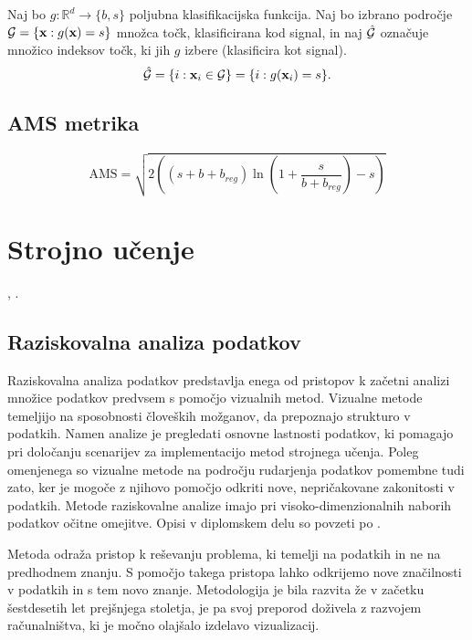 \documentclass[11pt,a4paper,openany]{book}
\begin{document}
Naj bo $g : \mathbb{R}^d \rightarrow \{b, s\}$ poljubna klasifikacijska funkcija. Naj bo izbrano področje ${\cal G} = \{\textbf{x} : g(\textbf{x}) = s\}$ množca točk, klasificirana kod signal, in naj $\hat{\cal G}$ označuje množico indeksov točk, ki jih $g$ izbere (klasificira kot signal).
\begin{equation*}
\hat{\cal G} = \{ i : \textbf{x}_i \in {\cal G}\} = \{ i : g(\textbf{x}_i) = s \}.
\end{equation*}


\section{AMS metrika}
\label{sc:ams}
\begin{equation}
\text{AMS} = \sqrt{2 \left( ( s + b + b_{reg} ) \ln \left( 1 +  \frac{s}{b + b_{reg}} \right) - s \right) }
\label{en:ams}
\end{equation}

\chapter{Strojno učenje}

\cite{Mitchell1997}, \cite{Witten2005}.

\section{Raziskovalna analiza podatkov}
Raziskovalna analiza podatkov predstavlja enega od pristopov k začetni analizi množice podatkov predvsem s pomočjo vizualnih metod. Vizualne metode temeljijo na sposobnosti človeških možganov, da prepoznajo strukturo v podatkih. Namen analize je pregledati osnovne lastnosti podatkov, ki pomagajo pri določanju scenarijev za implementacijo metod strojnega učenja. Poleg omenjenega so vizualne metode na področju rudarjenja podatkov pomembne tudi zato, ker je mogoče z njihovo pomočjo odkriti nove, nepričakovane zakonitosti v podatkih. Metode raziskovalne analize imajo pri visoko-dimenzionalnih naborih podatkov očitne omejitve. Opisi v diplomskem delu so povzeti po \cite{hand2001}.

Metoda odraža pristop k reševanju problema, ki temelji na podatkih in ne na predhodnem znanju. S pomočjo takega pristopa lahko odkrijemo nove značilnosti v podatkih in s tem novo znanje. Metodologija je bila razvita že v začetku šestdesetih let prejšnjega stoletja, je pa svoj preporod doživela z razvojem računalništva, ki je močno olajšalo izdelavo vizualizacij. 
\end{document}
